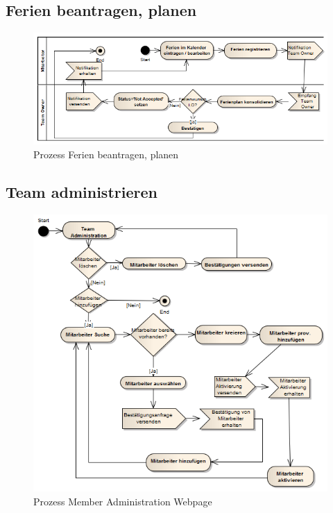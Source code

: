 \subsection{Ferien beantragen, planen}\label{prozess:ferien}
 \begin{figure}[H]
  	\centering
    	\includegraphics[width=15cm]{images/process_vacation}
 	\caption{Prozess Ferien beantragen, planen}
\end{figure}


\subsection{Team administrieren}\label{prozess:team}
 \begin{figure}[H]
  	\centering
    	\includegraphics[width=15cm]{images/process_team_administration}
 	\caption{Prozess Member Administration Webpage}
\end{figure}

